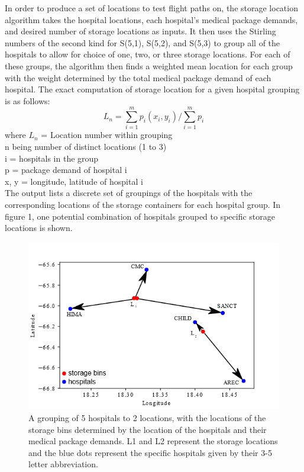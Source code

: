 \documentclass[twocolumn,10pt]{asme2ej}
\begin{document}
In order to produce a set of locations to test flight paths on, the storage location algorithm takes the hospital locations, each hospital's medical package demands, and desired number of storage locations as inputs. It then uses the Stirling numbers of the second kind for S(5,1), S(5,2), and S(5,3) to group all of the hospitals to allow for choice of one, two, or three storage locations. For each of these groups, the algorithm then finds a weighted mean location for each group with the weight determined by the total medical package demand of each hospital. The exact computation of storage location for a given hospital grouping is as follows:
\[ 
L_n = \sum_{i=1}^{m} p_i(x_i, y_i) / \sum_{i=1}^{m} p_i 
\]
where $L_n$ = Location number within grouping \\
n being number of distinct locations (1 to 3) \\
i = hospitals in the group \\
p = package demand of hospital i \\
x, y = longitude, latitude of hospital i \\
The output lists a discrete set of groupings of the hospitals with the corresponding locations of the storage containers for each hospital group. In figure 1, one potential combination of hospitals grouped to specific storage locations is shown. 

\begin{figure}
	\centering
	\includegraphics[width=0.7\linewidth]{../storage_fig2}
	\caption[Fig 1]{A grouping of 5 hospitals to 2 locations, with the locations of the storage bins determined by the location of the hospitals and their medical package demands. L1 and L2 represent the storage locations and the blue dots represent the specific hospitals given by their 3-5 letter abbreviation.}
	\label{Fig 1}
	\end{figure}
	
\end{document}
